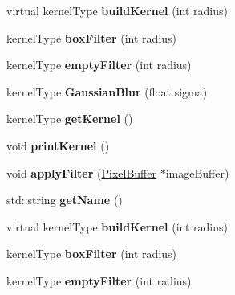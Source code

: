 \begin{DoxyCompactItemize}
\item 
\hypertarget{classFBlur_aaab8c0952f8a340f15d6d1200d3d003f}{virtual kernel\-Type {\bfseries build\-Kernel} (int radius)}\label{classFBlur_aaab8c0952f8a340f15d6d1200d3d003f}

\item 
\hypertarget{classFBlur_a97ca2bede17042bae70d781859d46e73}{kernel\-Type {\bfseries box\-Filter} (int radius)}\label{classFBlur_a97ca2bede17042bae70d781859d46e73}

\item 
\hypertarget{classFBlur_ab13f7d8c36423e3f0ecabdcd9b045fbf}{kernel\-Type {\bfseries empty\-Filter} (int radius)}\label{classFBlur_ab13f7d8c36423e3f0ecabdcd9b045fbf}

\item 
\hypertarget{classFBlur_ad88afc728cb9b8c84443a0bf4a30983f}{kernel\-Type {\bfseries Gaussian\-Blur} (float sigma)}\label{classFBlur_ad88afc728cb9b8c84443a0bf4a30983f}

\item 
\hypertarget{classFBlur_a7cb16fe19cd319be83d95de5686e8d39}{kernel\-Type {\bfseries get\-Kernel} ()}\label{classFBlur_a7cb16fe19cd319be83d95de5686e8d39}

\item 
\hypertarget{classFBlur_a5f500e9bad040039fb43e58be03d57e6}{void {\bfseries print\-Kernel} ()}\label{classFBlur_a5f500e9bad040039fb43e58be03d57e6}

\item 
\hypertarget{classFBlur_a20d9f9bb8f2b787273a860779853a8fd}{void {\bfseries apply\-Filter} (\hyperlink{classPixelBuffer}{Pixel\-Buffer} $\ast$image\-Buffer)}\label{classFBlur_a20d9f9bb8f2b787273a860779853a8fd}

\item 
\hypertarget{classFBlur_a3c121581f48e00e0267f88826808ee23}{std\-::string {\bfseries get\-Name} ()}\label{classFBlur_a3c121581f48e00e0267f88826808ee23}

\item 
\hypertarget{classFBlur_aaab8c0952f8a340f15d6d1200d3d003f}{virtual kernel\-Type {\bfseries build\-Kernel} (int radius)}\label{classFBlur_aaab8c0952f8a340f15d6d1200d3d003f}

\item 
\hypertarget{classFBlur_a97ca2bede17042bae70d781859d46e73}{kernel\-Type {\bfseries box\-Filter} (int radius)}\label{classFBlur_a97ca2bede17042bae70d781859d46e73}

\item 
\hypertarget{classFBlur_ab13f7d8c36423e3f0ecabdcd9b045fbf}{kernel\-Type {\bfseries empty\-Filter} (int radius)}\label{classFBlur_ab13f7d8c36423e3f0ecabdcd9b045fbf}


\end{DoxyCompactItemize}
